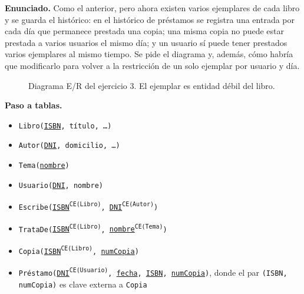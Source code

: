 \textbf{Enunciado.} Como el anterior, pero ahora existen varios ejemplares de
cada libro y se guarda el histórico: en el histórico de préstamos se registra una
entrada por cada día que permanece prestada una copia; una misma copia no puede
estar prestada a varios usuarios el mismo día; y un usuario sí puede tener
prestados varios ejemplares al mismo tiempo. Se pide el diagrama y, además,
cómo habría que modificarlo para volver a la restricción de un solo ejemplar por
usuario y día.

\begin{figure}[H]
\centering
{}
\caption{Diagrama E/R del ejercicio 3. El ejemplar es entidad débil del libro.}
\end{figure}

\textbf{Paso a tablas.}

\begin{itemize}[leftmargin=*]
    \item \texttt{Libro(\underline{ISBN}, título, \dots)}
    \item \texttt{Autor(\underline{DNI}, domicilio, \dots)}
    \item \texttt{Tema(\underline{nombre})}
    \item \texttt{Usuario(\underline{DNI}, nombre)}
    \item \texttt{Escribe(\underline{ISBN}\textsuperscript{CE(Libro)},
          \underline{DNI}\textsuperscript{CE(Autor)})}
    \item \texttt{TrataDe(\underline{ISBN}\textsuperscript{CE(Libro)},
          \underline{nombre}\textsuperscript{CE(Tema)})}
    \item \texttt{Copia(\underline{ISBN}\textsuperscript{CE(Libro)},
          \underline{numCopia})}
    \item \texttt{Préstamo(\underline{DNI}\textsuperscript{CE(Usuario)},
          \underline{fecha}, \underline{ISBN}, \underline{numCopia})}, donde el
          par \texttt{(ISBN, numCopia)} es clave externa a \texttt{Copia}
\end{itemize}

